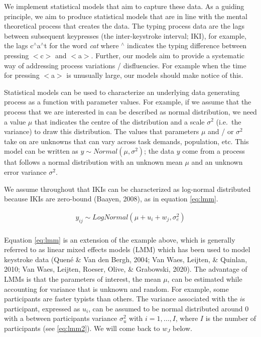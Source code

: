\documentclass[english,jou,floatsintext]{apa7}
\begin{document}
We implement statistical models that aim to capture these data. As a guiding principle, we aim to produce statistical models that are in line with the mental theoretical process that creates the data. The typing process data are the lags between subsequent keypresses (the inter-keystroke interval; IKI), for example, the lags c\(^{\wedge}\)a\(^{\wedge}\)t for the word \emph{cat} where \(^{\wedge}\) indicates the typing difference between pressing \(<\)c\(>\) and \(<\)a\(>\). Further, our models aim to provide a systematic way of addressing process variations / disfluencies. For example when the time for pressing \(<\)a\(>\) is unusually large, our models should make notice of this.

Statistical models can be used to characterize an underlying data generating process as a function with parameter values. For example, if we assume that the process that we are interested in can be described as normal distribution, we need a value \(\mu\) that indicates the centre of the distribution and a scale \(\sigma^2\) (i.e.~the variance) to draw this distribution. The values that parameters \(\mu\) and / or \(\sigma^2\) take on are unknowns that can vary across task demands, population, etc. This model can be written as \(y \sim Normal(\mu, \sigma^2)\); the data \(y\) come from a process that follows a normal distribution with an unknown mean \(\mu\) and an unknown error variance \(\sigma^2\).

We assume throughout that IKIs can be characterized as log-normal distributed because IKIs are zero-bound (Baayen, 2008), as in equation \ref{eq:lmm}.

\[
\tag{1}
\begin{aligned}
y_{ij} \sim LogNormal(\mu + u_i + w_j, \sigma_e^2)\\
\end{aligned}
\label{eq:lmm}
\]

Equation \ref{eq:lmm} is an extension of the example above, which is generally referred to as linear mixed effects models (LMM) which has been used to model keystroke data (Quené \& Van den Bergh, 2004; Van Waes, Leijten, \& Quinlan, 2010; Van Waes, Leijten, Roeser, Olive, \& Grabowski, 2020). The advantage of LMMs is that the parameters of interest, the mean \(\mu\), can be estimated while accounting for variance that is unknown and random. For example, some participants are faster typists than others. The variance associated with the \(i\)s participant, expressed as \(u_i\), can be assumed to be normal distributed around 0 with a between participants variance \(\sigma_u^2\) with \(i = 1, \dots, I\), where \(I\) is the number of participants (see \ref{eq:lmm2}). We will come back to \(w_J\) below.
\end{document}
